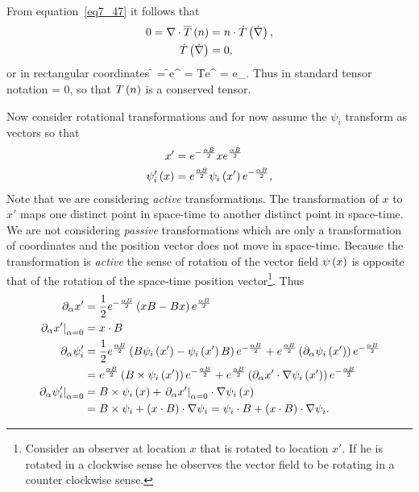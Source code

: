 From equation~\ref{eq7_47} it follows that
\begin{align}
	0 = \nabla\cdot{\overline{T}}\left ( {n} \right ) &= n\cdot {\dot{T}}\left ( {\dot{\nabla}} \right ), \\
	{\dot{T}}\left ( {\dot{\nabla}} \right ) &= 0,
\end{align}
or in rectangular coordinates
\be
	\f{}{\dot{\nabla}} = \f{}{e^{\mu}} = \f{T}{e^{\mu}} 
	                           = e_{\nu}.
\ee
Thus in standard tensor notation
\be
	 = 0,
\ee
so that ${T}\left ( {n} \right )$ is a conserved tensor.

Now consider rotational transformations and for now assume the $\psi_{i}$ transform as vectors so that
\begin{align}
	x' &= e^{-\frac{\alpha B}{2}}xe^{\frac{\alpha B}{2}} \\
	{\psi'_{i}}\left ( {x} \right ) &= e^{\frac{\alpha B}{2}}{\psi_{i}}\left ( {x'} \right ) e^{-\frac{\alpha B}{2}}, 
\end{align}
Note that we are considering \emph{active} transformations.  The transformation of $x$ to $x'$ maps one distinct
point in space-time to another distinct point in space-time.  We are not considering \emph{passive} transformations
which are only a transformation of coordinates and the position vector does not move in space-time. Because the 
transformation is \emph{active} the sense of rotation of the vector field ${\psi}\left ( {x} \right )$ is opposite that of the 
rotation of the space-time position vector\footnote{Consider an observer at location $x$ that is rotated to location $x'$. If he is 
rotated in a clockwise sense he observes the vector field to be rotating in a counter clockwise sense.}. Thus
\begin{align}
	\partial_{\alpha}x' &= \displaystyle\frac{1}{2} e^{-\frac{\alpha B}{2}}\left ( {xB-Bx} \right ) e^{\frac{\alpha B}{2}} \nonumber \\
	\left . {\partial_{\alpha}x'} \right |_{\alpha=0} &= x\cdot B \\	
	\partial_{\alpha}\psi'_{i} &= \displaystyle\frac{1}{2} e^{\frac{\alpha B}{2}}\left ( {B{\psi_{i}}\left ( {x'} \right )-{\psi_{i}}\left ( {x'} \right ) B} \right ) e^{-\frac{\alpha B}{2}}
	                              +e^{\frac{\alpha B}{2}}\left ( {\partial_{\alpha}{\psi_{i}}\left ( {x'} \right )} \right ) e^{-\frac{\alpha B}{2}}  \nonumber \\
	                           &= e^{\frac{\alpha B}{2}}\left ( {B\times{\psi_{i}}\left ( {x'} \right )} \right ) e^{-\frac{\alpha B}{2}}
	                              +e^{\frac{\alpha B}{2}}\left ( {\partial_{\alpha}x'\cdot\nabla{\psi_{i}}\left ( {x'} \right )} \right ) e^{-\frac{\alpha B}{2}} \\
	\left . {\partial_{\alpha}\psi'_{i}} \right |_{\alpha=0} &= B\times {\psi_{i}}\left ( {x} \right ) +\left . {\partial_{\alpha}x'} \right |_{\alpha=0}\cdot\nabla{\psi_{i}}\left ( {x} \right )  \nonumber \\
	                                            &= B\times \psi_{i} +\left ( {x\cdot B} \right )\cdot\nabla\psi_{i} =  \psi_{i}\cdot B +\left ( {x\cdot B} \right )\cdot\nabla\psi_{i}.          
\end{align}
